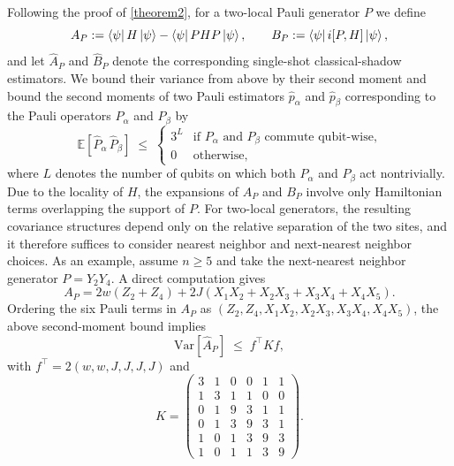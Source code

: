 Following the proof of \cref{theorem2}, for a two-local Pauli generator $P$ we define
\begin{equation}
    A_P := \bra{\psi}H\ket{\psi} - \bra{\psi}PHP\ket{\psi},
    \qquad
    B_P := \bra{\psi} i[P,H]\ket{\psi},
\end{equation}
and let $\hat A_P$ and $\hat B_P$ denote the corresponding single-shot classical-shadow estimators. We bound their variance from above by their second moment and bound the second moments of two Pauli estimators $\hat{p}_\alpha$ and $\hat{p}_\beta$ corresponding to the Pauli operators $P_\alpha$ and $P_\beta$ by 
\begin{equation}
    \mathbb{E}\!\left[\hat P_\alpha\,\hat P_\beta\right]
    \;\le\;
    \begin{cases}
        3^{L} & \text{if $P_\alpha$ and $P_\beta$ commute qubit-wise,}\\
        0     & \text{otherwise,}
    \end{cases}
\end{equation}
where $L$ denotes the number of qubits on which both $P_\alpha$ and $P_\beta$ act nontrivially.
Due to the locality of $H$, the expansions of $A_P$ and $B_P$ involve only Hamiltonian terms overlapping the support of $P$. For two-local generators, the resulting covariance structures depend only on the relative separation of the two sites, and it therefore suffices to consider nearest neighbor and next-nearest neighbor choices. As an example, assume $n\geq 5$ and take the next-nearest neighbor generator $P = Y_2Y_4$. A direct computation gives
\begin{equation}
    A_P = 2w(Z_2+Z_4)+2J(X_1X_2+X_2X_3+X_3X_4+X_4X_5).
\end{equation}
Ordering the six Pauli terms in $A_P$ as $(Z_2, Z_4, X_1X_2, X_2X_3,X_3X_4,X_4X_5)$, the above second-moment bound implies
\begin{equation}
    \mathrm{Var}[\hat A_P] \;\le\; f^\top K f,
\end{equation}
with $f^\top = 2(w,w,J,J,J,J)$ and
\begin{equation}
    K=\begin{pmatrix}
        3&1&0&0&1&1\\
        1&3&1&1&0&0\\
        0&1&9&3&1&1\\
        0&1&3&9&3&1\\
        1&0&1&3&9&3\\
        1&0&1&1&3&9
    \end{pmatrix}.
\end{equation}

